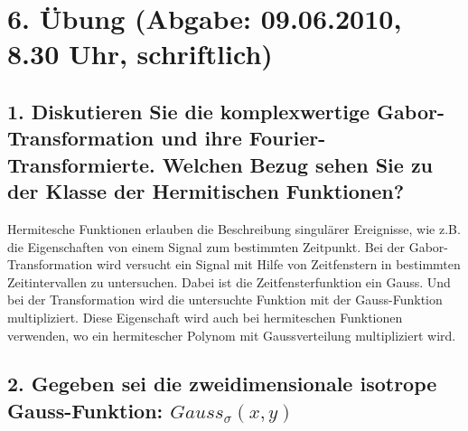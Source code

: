 \section*{6. \"Ubung (Abgabe: 09.06.2010, 8.30 Uhr, schriftlich)}

\subsection*{1. Diskutieren Sie die komplexwertige Gabor-Transformation und ihre Fourier-Transformierte. Welchen Bezug sehen Sie zu der Klasse der Hermitischen Funktionen?}
Hermitesche Funktionen erlauben die Beschreibung singul\"arer Ereignisse, wie z.B. die Eigenschaften von einem Signal zum bestimmten Zeitpunkt. Bei der Gabor-Transformation wird versucht ein Signal mit Hilfe von Zeitfenstern in bestimmten Zeitintervallen zu untersuchen. Dabei ist die Zeitfensterfunktion ein Gauss. Und bei der Transformation wird die untersuchte Funktion mit der Gauss-Funktion multipliziert. Diese Eigenschaft wird auch bei hermiteschen Funktionen verwenden, wo ein hermitescher Polynom mit Gaussverteilung multipliziert wird.

\subsection*{2. Gegeben sei die zweidimensionale isotrope Gauss-Funktion: $Gauss_{\sigma}(x,y)$}
